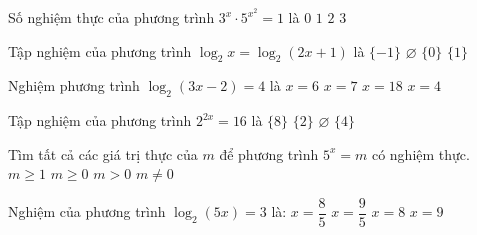 \begin{ex}%
	 Số nghiệm thực của phương trình $3^x \cdot 5^{x^2}=1$ là
	 \choice
		{$0$} 
		 {$1$}
		 {\True $2$}
		 {$3$}
\end{ex}

\begin{ex}%
	Tập  nghiệm của phương trình $\log_2x=\log_2(2x+1)$ là
	\choice 
		{$\{-1\}$} 
		{\True $\varnothing$} 
		 {$\{0\}$}
		{$\{1\}$} 
\end{ex}

\begin{ex}%
	Nghiệm phương trình  $\log_2 \left(3x-2\right)=4$ là
	 \choice
		 {\True $x=6$}
		 {$x=7$}
		{$x=18$} 
		 {$x=4$}
\end{ex}

\begin{ex}%
	Tập  nghiệm của phương trình $2^{2 x}=16$ là
	 \choice
		{$\{8\}$} 
		{\True  $\{2\}$}
		 {$\varnothing$}
		{$\{4\}$} 
\end{ex}

\begin{ex}%
	Tìm tất cả các giá trị  thực của $m$ để phương trình $5^x=m$ có nghiệm thực.
	 \choice
		{$m\ge  1$}
		 {$m\ge 0$}
		{\True $m > 0$} 
		{$m\ne 0$} 
\end{ex}

\begin{ex}%
	Nghiệm của phương trình ${{\log }_2}(  5x)=3$ là:
	\choice 
		 {\True $ x=\dfrac{8}{5}$}
		{$ x=\dfrac{9}{5}$} 
		 {$ x=8$}
		{$  x=9$}
\end{ex}

